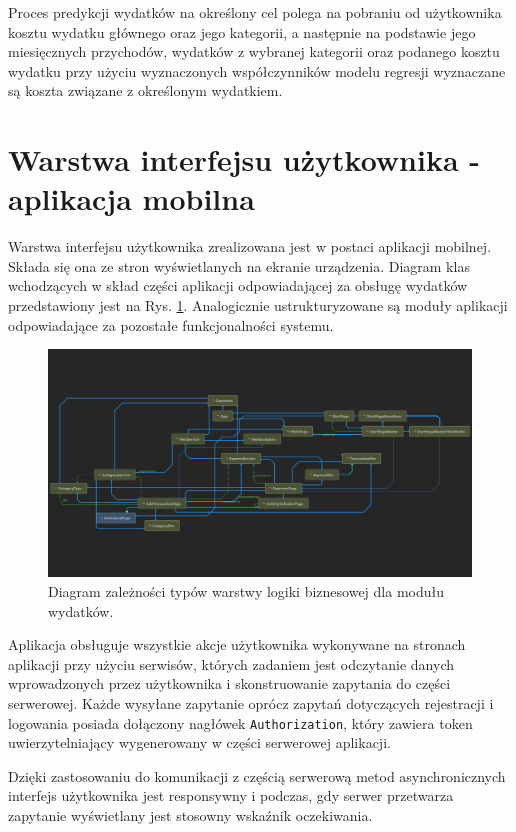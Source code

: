 Proces predykcji wydatków na określony cel polega na pobraniu od użytkownika kosztu wydatku głównego oraz jego kategorii, a następnie na podstawie jego miesięcznych przychodów, wydatków z wybranej kategorii oraz podanego kosztu wydatku przy użyciu wyznaczonych współczynników modelu regresji wyznaczane są koszta związane z określonym wydatkiem.
\section{Warstwa interfejsu użytkownika - aplikacja mobilna}
Warstwa interfejsu użytkownika zrealizowana jest w postaci aplikacji mobilnej. Składa się ona ze stron wyświetlanych na ekranie urządzenia. Diagram klas wchodzących w skład części aplikacji odpowiadającej za obsługę wydatków przedstawiony jest na Rys. \ref{xamarinexpenses}. Analogicznie ustrukturyzowane są moduły aplikacji odpowiadające za pozostałe funkcjonalności systemu.
\begin{figure}[!ht]
	\begin{center}
		\includegraphics[width=6in]{img/diagram/interface_diagram.png}
		\caption{Diagram zależności typów warstwy logiki biznesowej dla modułu wydatków.}
		\label{xamarinexpenses}
	\end{center}
\end{figure}

Aplikacja obsługuje wszystkie akcje użytkownika wykonywane na stronach aplikacji przy użyciu serwisów, których zadaniem jest odczytanie danych wprowadzonych przez użytkownika i skonstruowanie zapytania do części serwerowej. Każde wysyłane zapytanie oprócz zapytań dotyczących rejestracji i logowania posiada dołączony nagłówek \lstinline|Authorization|, który zawiera token uwierzytelniający wygenerowany w części serwerowej aplikacji.

Dzięki zastosowaniu do komunikacji z częścią serwerową metod asynchronicznych interfejs użytkownika jest responsywny i podczas, gdy serwer przetwarza zapytanie wyświetlany jest stosowny wskaźnik oczekiwania.